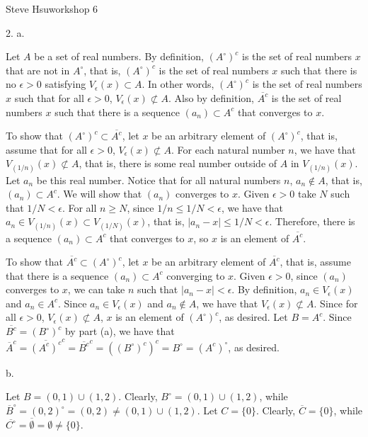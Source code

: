 \def\abs#1{\vert#1\vert}
\centerline{Steve Hsu\hfill workshop 6}
\item{2.} a.

Let $A$ be a set of real numbers.
By definition, $(A^\circ)^c$ is the set of real numbers $x$
that are not in $A^\circ$, that is,
$(A^\circ)^c$ is the set of real numbers $x$ such that
there is no $\epsilon > 0$ satisfying $V_\epsilon(x) \subset A$.
In other words, $(A^\circ)^c$ is the set of real numbers $x$
such that for all $\epsilon > 0$, $V_\epsilon(x) \not\subset A$.
Also by definition, $\overline{A^c}$ is the set of real numbers $x$
such that there is a sequence $(a_n) \subset A^c$
that converges to $x$.

To show that $(A^\circ)^c \subset \overline{A^c}$,
let $x$ be an arbitrary element of $(A^\circ)^c$, that is,
assume that for all $\epsilon > 0$, $V_\epsilon(x) \not\subset A$.
For each natural number $n$, we have that $V_{(1/n)}(x) \not\subset A$,
that is, there is some real number outside of $A$ in $V_{(1/n)}(x)$.
Let $a_n$ be this real number.
Notice that for all natural numbers $n$, $a_n \notin A$, that is,
$(a_n) \subset A^c$.
We will show that $(a_n)$ converges to $x$.
Given $\epsilon > 0$ take $N$ such that $1/N < \epsilon$.
For all $n \ge N$, since $1/n \le 1/N < \epsilon$, we have that
$a_n \in V_{(1/n)}(x) \subset V_{(1/N)}(x)$, that is,
$\abs{a_n - x} \le 1/N < \epsilon$.
Therefore, there is a sequence $(a_n) \subset A^c$ that converges to $x$,
so $x$ is an element of $\overline{A^c}$.

To show that $\overline{A^c} \subset (A^\circ)^c$,
let $x$ be an arbitrary element of $\overline{A^c}$, that is,
assume that there is a sequence $(a_n) \subset A^c$ converging to $x$.
Given $\epsilon > 0$, since $(a_n)$ converges to $x$,
we can take $n$ such that $\abs{a_n - x} < \epsilon$.
By definition, $a_n \in V_\epsilon(x)$ and $a_n \in A^c$.
Since $a_n \in V_\epsilon(x)$ and $a_n \notin A$,
we have that $V_\epsilon(x) \not\subset A$.
Since for all $\epsilon > 0$, $V_\epsilon(x) \not\subset A$,
$x$ is an element of $(A^\circ)^c$, as desired.
\medskip
Let $B = A^c$.
Since $\overline{B^c} = (B^\circ)^c$ by part (a), we have that
$\overline A^c = \overline{(A^c)^c}^c = \overline{B^c}^c =
((B^\circ)^c)^c = B^\circ = (A^c)^\circ$, as desired.
\bigskip
\item{} b.

Let $B = (0,1) \cup (1,2)$.
Clearly, $B^\circ = (0,1) \cup (1,2)$, while
$\overline B^\circ = (0,2)^\circ = (0,2) \ne (0,1) \cup (1,2)$.
\medskip
Let $C = \{0\}$.
Clearly, $\overline C = \{0\}$, while
$\overline{C^\circ} = \overline \emptyset = \emptyset \ne \{0\}$.
\bye

